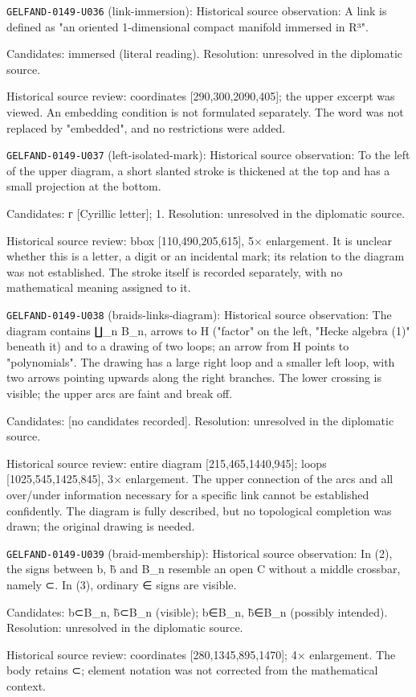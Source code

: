 \noindent\texttt{GELFAND-0149-U036} (link-immersion): Historical source observation: A link is defined as "an oriented 1-dimensional compact manifold immersed in R³".\par
Candidates: immersed (literal reading). Resolution: unresolved in the diplomatic source.\par
Historical source review: coordinates [290,300,2090,405]; the upper excerpt was viewed. An embedding condition is not formulated separately. The word was not replaced by "embedded", and no restrictions were added.\par

\noindent\texttt{GELFAND-0149-U037} (left-isolated-mark): Historical source observation: To the left of the upper diagram, a short slanted stroke is thickened at the top and has a small projection at the bottom.\par
Candidates: г [Cyrillic letter]; 1. Resolution: unresolved in the diplomatic source.\par
Historical source review: bbox [110,490,205,615], 5× enlargement. It is unclear whether this is a letter, a digit or an incidental mark; its relation to the diagram was not established. The stroke itself is recorded separately, with no mathematical meaning assigned to it.\par

\noindent\texttt{GELFAND-0149-U038} (braids-links-diagram): Historical source observation: The diagram contains ∐\_n B\_n, arrows to H ("factor" on the left, "Hecke algebra (1)" beneath it) and to a drawing of two loops; an arrow from H points to "polynomials". The drawing has a large right loop and a smaller left loop, with two arrows pointing upwards along the right branches. The lower crossing is visible; the upper arcs are faint and break off.\par
Candidates: [no candidates recorded]. Resolution: unresolved in the diplomatic source.\par
Historical source review: entire diagram [215,465,1440,945]; loops [1025,545,1425,845], 3× enlargement. The upper connection of the arcs and all over/under information necessary for a specific link cannot be established confidently. The diagram is fully described, but no topological completion was drawn; the original drawing is needed.\par

\noindent\texttt{GELFAND-0149-U039} (braid-membership): Historical source observation: In (2), the signs between b, b̃ and B\_n resemble an open C without a middle crossbar, namely ⊂. In (3), ordinary ∈ signs are visible.\par
Candidates: b⊂B\_n, b̃⊂B\_n (visible); b∈B\_n, b̃∈B\_n (possibly intended). Resolution: unresolved in the diplomatic source.\par
Historical source review: coordinates [280,1345,895,1470]; 4× enlargement. The body retains ⊂; element notation was not corrected from the mathematical context.\par

